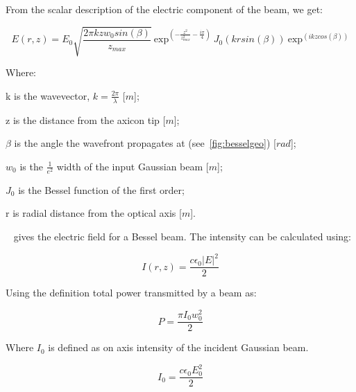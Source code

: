 
From the scalar description of the electric component of the beam, we get:

\begin{equation}
    E(r,z)=E_0\sqrt{\frac{2\pi k z w_0sin(\beta)}{z_{max}}}\ \text{exp}^{\left(-\frac{z^2}{z_{max}^2}-\frac{i\pi}{4}\right)}\ J_0\left(krsin(\beta)\right)\ \text{exp}^{\left(ikzcos(\beta)\right)}
    \label{eqn:besselEfield}
\end{equation}

\noindent Where:

    \indent k is the wavevector, $k=\tfrac{2\pi}{\lambda}$ [$m$];

    \indent z is the distance from the axicon tip [$m$]; 

    \indent $\beta$ is the angle the wavefront propagates at (see~\cref{fig:besselgeo}) [$rad$]; 

    \indent $w_0$ is the $\tfrac{1}{e^2}$ width of the input Gaussian beam [$m$]; 

    \indent $J_0$ is the Bessel function of the first order; 

    \indent r is radial distance from the optical axis [$m$]. 

\medskip


~ gives the electric field for a Bessel beam. The intensity can be calculated using:

\begin{equation}
    I(r,z)=\frac{c\epsilon_0\left|E\right|^2}{2}
    \label{eqn:besselintsub}
\end{equation}

Using the definition total power transmitted by a beam as:

\begin{equation}
    P=\frac{\pi I_0w_0^2}{2}
    \label{eqn:pwrdef}
\end{equation}

Where $I_0$ is defined as on axis intensity of the incident Gaussian beam.

\begin{equation}
    I_0=\frac{c\epsilon_0E_0^2}{2}
    \label{eqn:intdef}
\end{equation}

